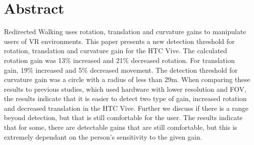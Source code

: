 \chapter*{Abstract}

Redirected Walking uses rotation, translation and curvature gains to manipulate users of VR environments. This paper presents a new detection threshold for rotation, translation and curvature gain for the HTC Vive. The calculated rotation gain was 13\% increased and 21\% decreased rotation. For translation gain, 19\% increased and 5\% decreased movement. The detection threshold for curvature gain was a circle with a radius of less than 29m. When comparing these results to previous studies, which used hardware with lower resolution and FOV, the results indicate that it is easier to detect two type of gain, increased rotation and decreased translation in the HTC Vive. Further we discuss if there is a range beyond detection, but that is still comfortable for the user. The results indicate that for some, there are detectable gains that are still comfortable, but this is extremely dependant on the person's sensitivity to the given gain.

\hypersetup{pageanchor=false}